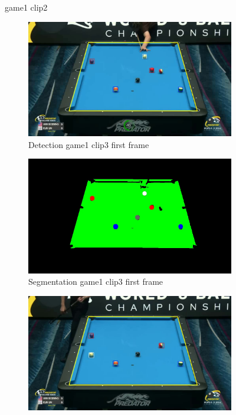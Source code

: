 \begin{figure}[H]
	\caption{game1 clip2}
\end{figure}

\begin{figure}[H]
	\centering
	\begin{subfigure}[b]{0.48\textwidth}
		\centering
		\includegraphics[width=\textwidth]{images/Detection/game1_clip3_detected_balls_first_frame.jpg}
		\caption{Detection game1 clip3 first frame}
		\label{fig: game1_clip3_first_frame_detected}
	\end{subfigure}
	\begin{subfigure}[b]{0.48\textwidth}
		\centering
		\includegraphics[width=\textwidth]{images/Segmentation/game1_clip3_segmented_balls_first_frame.jpg}
		\caption{Segmentation game1 clip3 first frame}
		\label{fig: game1_clip3_first_frame_segmented}
	\end{subfigure}
	\begin{subfigure}[b]{0.48\textwidth}
		\centering
		\includegraphics[width=\textwidth]{images/Detection/game1_clip3_detected_balls_last_frame.jpg}

\end{subfigure}
\end{figure}
